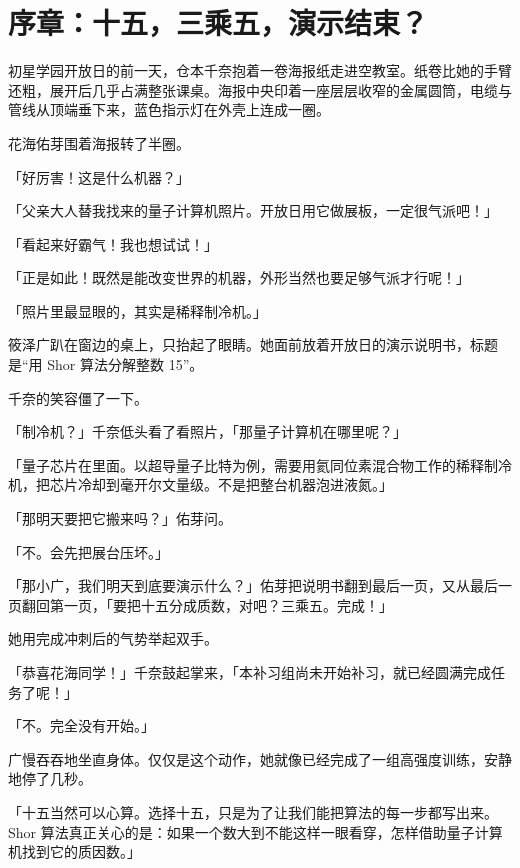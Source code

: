 

\section*{序章：十五，三乘五，演示结束？}
{}

初星学园开放日的前一天，仓本千奈抱着一卷海报纸走进空教室。纸卷比她的手臂还粗，展开后几乎占满整张课桌。海报中央印着一座层层收窄的金属圆筒，电缆与管线从顶端垂下来，蓝色指示灯在外壳上连成一圈。

花海佑芽围着海报转了半圈。

「好厉害！这是什么机器？」

「父亲大人替我找来的量子计算机照片。开放日用它做展板，一定很气派吧！」

「看起来好霸气！我也想试试！」

「正是如此！既然是能改变世界的机器，外形当然也要足够气派才行呢！」

「照片里最显眼的，其实是稀释制冷机。」

筱泽广趴在窗边的桌上，只抬起了眼睛。她面前放着开放日的演示说明书，标题是“用 Shor 算法分解整数 15”。

千奈的笑容僵了一下。

「制冷机？」千奈低头看了看照片，「那量子计算机在哪里呢？」

「量子芯片在里面。以超导量子比特为例，需要用氦同位素混合物工作的稀释制冷机，把芯片冷却到毫开尔文量级。不是把整台机器泡进液氮。」\cite{ch07ibmtech}

「那明天要把它搬来吗？」佑芽问。

「不。会先把展台压坏。」

「那小广，我们明天到底要演示什么？」佑芽把说明书翻到最后一页，又从最后一页翻回第一页，「要把十五分成质数，对吧？三乘五。完成！」

她用完成冲刺后的气势举起双手。

「恭喜花海同学！」千奈鼓起掌来，「本补习组尚未开始补习，就已经圆满完成任务了呢！」

「不。完全没有开始。」

广慢吞吞地坐直身体。仅仅是这个动作，她就像已经完成了一组高强度训练，安静地停了几秒。

「十五当然可以心算。选择十五，只是为了让我们能把算法的每一步都写出来。Shor 算法真正关心的是：如果一个数大到不能这样一眼看穿，怎样借助量子计算机找到它的质因数。」


